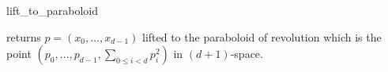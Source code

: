 \begin{ccRefFunction}{lift_to_paraboloid}

{returns $p = (x_0,\ldots,x_{d-1})$ lifted to the paraboloid 
of revolution which is the point 
$(p_0, \ldots,p_{d-1},\sum_{0 \le i < d}p_i^2)$ in $(d+1)$-space.}

\end{ccRefFunction}


